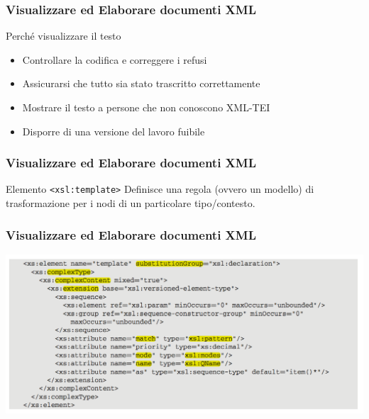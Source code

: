 \begin{frame}
    \frametitle{Visualizzare ed Elaborare documenti XML}
    \addtocounter{nframe}{1}
    

     \begin{block}{Perché visualizzare il testo}
         \begin{itemize}
            \item  Controllare la codifica e correggere i refusi
             \item Assicurarsi che tutto sia stato trascritto correttamente
             \item Mostrare il testo a persone che non conoscono XML-TEI
             \item Disporre di una versione del lavoro fuibile
        \end{itemize}
     \end{block}
    
\end{frame}

\begin{frame}
    \frametitle{Visualizzare ed Elaborare documenti XML}
    \addtocounter{nframe}{1}
    

     \begin{block}{Elemento \texttt{<xsl:template>}}
        Definisce una regola (ovvero un modello) di trasformazione per i nodi di un particolare tipo/contesto.
     \end{block}
    
\end{frame}

\begin{frame}
    \frametitle{Visualizzare ed Elaborare documenti XML}
    \addtocounter{nframe}{1}
    
    \begin{center}
        \includegraphics[width=.9\textwidth]{imgs/Schema-template.png}
    \end{center}

\end{frame}

